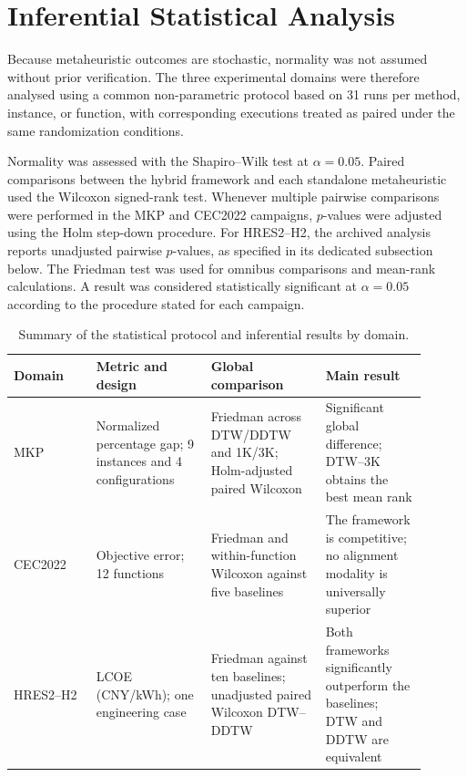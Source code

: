 %   

\section{Inferential Statistical Analysis}
\label{sec:global-statistical-analysis}

Because metaheuristic outcomes are stochastic, normality was not assumed without prior verification. The three experimental domains were therefore analysed using a common non-parametric protocol based on 31 runs per method, instance, or function, with corresponding executions treated as paired under the same randomization conditions.

Normality was assessed with the Shapiro--Wilk test at $\alpha=0.05$. Paired
comparisons between the hybrid framework and each standalone metaheuristic used
the Wilcoxon signed-rank test. Whenever multiple pairwise comparisons were
performed in the MKP and CEC2022 campaigns, $p$-values were adjusted using the
Holm step-down procedure. For HRES2--H2, the archived analysis reports
unadjusted pairwise $p$-values, as specified in its dedicated subsection below.
The Friedman test was used for omnibus comparisons and mean-rank calculations.
A result was considered statistically significant at $\alpha=0.05$ according
to the procedure stated for each campaign.

\begin{table}[htbp]
\centering
\caption{Summary of the statistical protocol and inferential results by domain.}
\label{tab:statistical-summary-domains}
\small
\begin{tabular}{p{0.18\linewidth}p{0.25\linewidth}p{0.25\linewidth}p{0.22\linewidth}}
\toprule
Domain & Metric and design & Global comparison & Main result \\
\midrule
MKP & Normalized percentage gap; 9 instances and 4 configurations & Friedman across DTW/DDTW and 1K/3K; Holm-adjusted paired Wilcoxon & Significant global difference; DTW--3K obtains the best mean rank \\
CEC2022 & Objective error; 12 functions & Friedman and within-function Wilcoxon against five baselines & The framework is competitive; no alignment modality is universally superior \\
HRES2--H2 & LCOE (CNY/kWh); one engineering case & Friedman against ten baselines; unadjusted paired Wilcoxon DTW--DDTW & Both frameworks significantly outperform the baselines; DTW and DDTW are equivalent \\
\bottomrule
\end{tabular}
\end{table}

